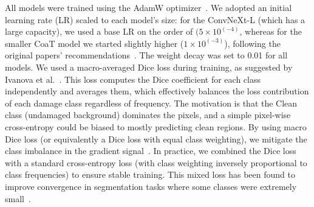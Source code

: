 \documentclass[conference]{IEEEtran}
\begin{document}
All models were trained using the AdamW optimizer~\cite{loshchilov_decoupled_2019}. We adopted an initial learning rate (LR) scaled to each model's size: for the ConvNeXt-L (which has a large capacity), we used a base LR on the order of $(5×10^(-4)$, whereas for the smaller CoaT model we started slightly higher ($1×10^(-3)$), following the original papers' recommendations~\cite{liu_swin_2021,liu_convnet_2022,wang_upernet_2023,xu_co-scale_2021,ivanova_artefact_2024}. The weight decay was set to 0.01 for all models. We used a macro-averaged Dice loss during training, as suggested by Ivanova et al.~\cite{ivanova_artefact_2024}. This loss computes the Dice coefficient for each class independently and averages them, which effectively balances the loss contribution of each damage class regardless of frequency. The motivation is that the Clean class (undamaged background) dominates the pixels, and a simple pixel-wise cross-entropy could be biased to mostly predicting clean regions. By using macro Dice loss (or equivalently a Dice loss with equal class weighting), we mitigate the class imbalance in the gradient signal~\cite{ivanova_artefact_2024}. In practice, we combined the Dice loss with a standard cross-entropy loss (with class weighting inversely proportional to class frequencies) to ensure stable training. This mixed loss has been found to improve convergence in segmentation tasks where some classes were extremely small~\cite{ivanova_artefact_2024}.
\end{document}
